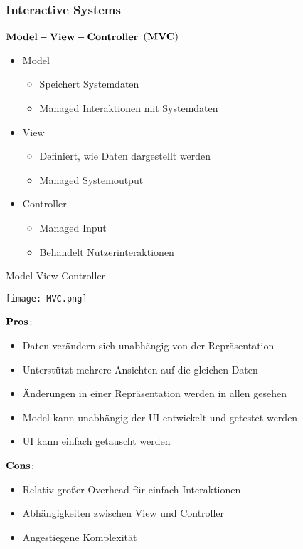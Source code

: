 \subsubsection{Interactive Systems}
$\bold{Model-View-Controller}$ $\bold{(MVC)}$
\begin{itemize}
	\item Model
		\begin{itemize}
			\item Speichert Systemdaten
			\item Managed Interaktionen mit Systemdaten
		\end{itemize}
	\item View
		\begin{itemize}
			\item Definiert, wie Daten dargestellt werden
			\item Managed Systemoutput
		\end{itemize}
	\item Controller
		\begin{itemize}
			\item Managed Input
			\item Behandelt Nutzerinteraktionen
		\end{itemize}
\end{itemize}
\begin{table}[H]
\caption{Model-View-Controller}
\texttt{[image: MVC.png]}
\end{table}
\begin{multicols}{2}
$\bold{Pros}$:
\begin{itemize}
	\item Daten verändern sich unabhängig von der Repräsentation
	\item Unterstützt mehrere Ansichten auf die gleichen Daten
	\item Änderungen in einer Repräsentation werden in allen gesehen
	\item Model kann unabhängig der UI entwickelt und getestet werden
	\item UI kann einfach getauscht werden
\end{itemize}
\columnbreak
$\bold{Cons}$:
\begin{itemize}
	\item Relativ großer Overhead für einfach Interaktionen
	\item Abhängigkeiten zwischen View und Controller
	\item Angestiegene Komplexität
\end{itemize}
\end{multicols}



